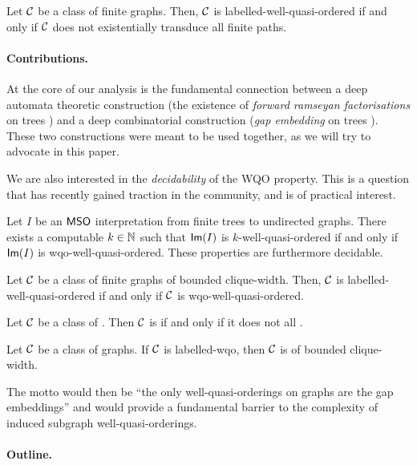 \begin{conjecture}
    \label{transduction:conj}
    Let $\mathcal{C}$ be a class of finite graphs.
    Then, $\mathcal{C}$ is labelled-well-quasi-ordered
    if and only if
    $\mathcal{C}$
    does not existentially transduce all finite paths.
\end{conjecture}


\paragraph*{Contributions.} At the core of our analysis is the fundamental
connection between a deep automata theoretic construction (the existence of
\emph{forward ramseyan factorisations} on trees \cite{COLC07}) and a deep
combinatorial construction (\emph{gap embedding} on trees
\cite{DERSHOWITZ200380}). These two constructions were meant to be used
together, as we will try to advocate in this paper.

We are also interested in the \emph{decidability} of the WQO property. This is
a question that has recently gained traction in the community, and is of
practical interest.

\begin{theorem}[restate=effective-image:thm,label={effective-image:thm}]
    \label{effective-image:thm}
    Let $I$ be an $\mathsf{MSO}$ interpretation
    from finite trees to undirected graphs.
    There exists a computable $k \in \mathbb{N}$
    such that $\mathsf{Im}(I)$
    is $k$-well-quasi-ordered
    if and only if 
    $\mathsf{Im}(I)$ is wqo-well-quasi-ordered.
    These properties are furthermore decidable.
\end{theorem}

\begin{theorem}[restate=pouzet2:thm]
    \label{pouzet-2:thm}
    Let $\mathcal{C}$ be a class of finite graphs of bounded clique-width.
    Then, $\mathcal{C}$ is labelled-well-quasi-ordered
    if and only if 
    $\mathcal{C}$ is wqo-well-quasi-ordered.
\end{theorem}

\begin{theorem}[restate=transductions-paths:thm,label={transductions-paths:thm}]
    \label{transductions-paths:thm}
    Let $\mathcal{C}$ be a class of .
    Then $\mathcal{C}$ is 
    if and only if
    it does not 
    all .
\end{theorem}


\begin{conjecture}
    \label{nip-cw:conj}
    Let $\mathcal{C}$ be a class of graphs.
    If $\mathcal{C}$ is labelled-wqo,
    then $\mathcal{C}$ is of bounded clique-width.
\end{conjecture}

The motto would then be ``the only well-quasi-orderings on graphs are the gap
embeddings'' and would provide a fundamental barrier to the complexity of
induced subgraph well-quasi-orderings.

\paragraph*{Outline.}
